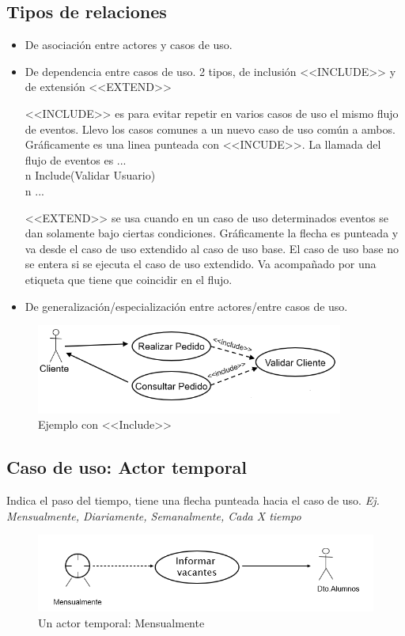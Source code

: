 \documentclass[titlepage,a4paper]{article}
\begin{document}
\subsection{Tipos de relaciones}
\begin{itemize}
    \item De asociación entre actores y casos de uso.
    \item De dependencia entre casos de uso. 2 tipos, de inclusión <<INCLUDE>> y de extensión <<EXTEND>>
    
    <<INCLUDE>> es para evitar repetir en varios casos de uso el mismo flujo de eventos. Llevo los casos comunes a un nuevo caso de uso común a ambos. Gráficamente es una linea punteada con <<INCUDE>>. La llamada del flujo de eventos es ... \\n Include(Validar Usuario)  \\n ...
    
    <<EXTEND>> se usa cuando en un caso de uso determinados eventos se dan solamente bajo ciertas condiciones. Gráficamente la flecha es punteada y va desde el caso de uso extendido al caso de uso base. El caso de uso base no se entera si se ejecuta el caso de uso extendido. Va acompañado por una etiqueta que tiene que coincidir en el flujo.
    
    \item De generalización/especialización entre actores/entre casos de uso.
\end{itemize}

\begin{figure}[!htb]
    \centering
    \includegraphics[width=0.9\textwidth]{Imagenes/IncludeCasoDeUso.png}
    \caption{Ejemplo con <<Include>>}
\end{figure}

\subsection{Caso de uso: Actor temporal}
Indica el paso del tiempo, tiene una flecha punteada hacia el caso de uso. \textit{Ej. Mensualmente, Diariamente, Semanalmente, Cada X tiempo}

\begin{figure}[!htb]
    \centering
    \includegraphics[width=0.9 \textwidth]{Imagenes/ActorTemporalCasoDeUso.png}
    \caption{Un actor temporal: Mensualmente}
\end{figure}
\end{document}
